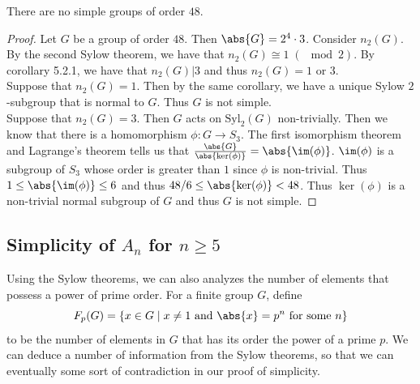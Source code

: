 \documentclass[a4paper]{article}
\begin{document}
\begin{prp}{}{} There are no simple groups of order $48$. 
\begin{proof}
Let $G$ be a group of order $48$. Then $\abs{G}=2^4\cdot 3$. Consider $n_2(G)$. By the second Sylow theorem, we have that $n_2(G)\cong 1\;(\;\bmod 2)$. By corollary 5.2.1, we have that $n_2(G)|3$ and thus $n_2(G)=1$ or $3$. \\
Suppose that $n_2(G)=1$. Then by the same corollary, we have a unique Sylow $2$-subgroup that is normal to $G$. Thus $G$ is not simple. \\
Suppose that $n_2(G)=3$. Then $G$ acts on $\text{Syl}_2(G)$ non-trivially. Then we know that there is a homomorphism $\phi:G\to S_3$. The first isomorphism theorem and Lagrange's theorem tells us that $\frac{\abs{G}}{\abs{\ker(\phi)}}=\abs{\im(\phi)}$. $\im(\phi)$ is a subgroup of $S_3$ whose order is greater than $1$ since $\phi$ is non-trivial. Thus $1\leq\abs{\im(\phi)}\leq 6$ and thus $48/6\leq\abs{\ker(\phi)}<48$. Thus $\ker(\phi)$ is a non-trivial normal subgroup of $G$ and thus $G$ is not simple. 
\end{proof}
\end{prp}

\subsection{Simplicity of $A_n$ for $n\geq 5$}
Using the Sylow theorems, we can also analyzes the number of elements that possess a power of prime order. For a finite group $G$, define $$F_p(G)=\{x\in G\;|\;x\neq 1\text{ and }\abs{x}=p^n\text{ for some }n\}$$ to be the number of elements in $G$ that has its order the power of a prime $p$. We can deduce a number of information from  the Sylow theorems, so that we can eventually some sort of contradiction in our proof of simplicity. 
\end{document}
